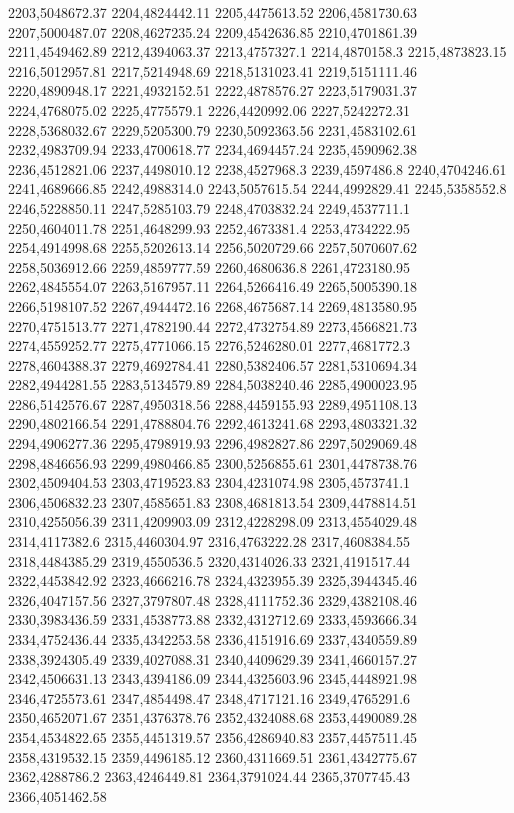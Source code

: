 2203,5048672.37
2204,4824442.11
2205,4475613.52
2206,4581730.63
2207,5000487.07
2208,4627235.24
2209,4542636.85
2210,4701861.39
2211,4549462.89
2212,4394063.37
2213,4757327.1
2214,4870158.3
2215,4873823.15
2216,5012957.81
2217,5214948.69
2218,5131023.41
2219,5151111.46
2220,4890948.17
2221,4932152.51
2222,4878576.27
2223,5179031.37
2224,4768075.02
2225,4775579.1
2226,4420992.06
2227,5242272.31
2228,5368032.67
2229,5205300.79
2230,5092363.56
2231,4583102.61
2232,4983709.94
2233,4700618.77
2234,4694457.24
2235,4590962.38
2236,4512821.06
2237,4498010.12
2238,4527968.3
2239,4597486.8
2240,4704246.61
2241,4689666.85
2242,4988314.0
2243,5057615.54
2244,4992829.41
2245,5358552.8
2246,5228850.11
2247,5285103.79
2248,4703832.24
2249,4537711.1
2250,4604011.78
2251,4648299.93
2252,4673381.4
2253,4734222.95
2254,4914998.68
2255,5202613.14
2256,5020729.66
2257,5070607.62
2258,5036912.66
2259,4859777.59
2260,4680636.8
2261,4723180.95
2262,4845554.07
2263,5167957.11
2264,5266416.49
2265,5005390.18
2266,5198107.52
2267,4944472.16
2268,4675687.14
2269,4813580.95
2270,4751513.77
2271,4782190.44
2272,4732754.89
2273,4566821.73
2274,4559252.77
2275,4771066.15
2276,5246280.01
2277,4681772.3
2278,4604388.37
2279,4692784.41
2280,5382406.57
2281,5310694.34
2282,4944281.55
2283,5134579.89
2284,5038240.46
2285,4900023.95
2286,5142576.67
2287,4950318.56
2288,4459155.93
2289,4951108.13
2290,4802166.54
2291,4788804.76
2292,4613241.68
2293,4803321.32
2294,4906277.36
2295,4798919.93
2296,4982827.86
2297,5029069.48
2298,4846656.93
2299,4980466.85
2300,5256855.61
2301,4478738.76
2302,4509404.53
2303,4719523.83
2304,4231074.98
2305,4573741.1
2306,4506832.23
2307,4585651.83
2308,4681813.54
2309,4478814.51
2310,4255056.39
2311,4209903.09
2312,4228298.09
2313,4554029.48
2314,4117382.6
2315,4460304.97
2316,4763222.28
2317,4608384.55
2318,4484385.29
2319,4550536.5
2320,4314026.33
2321,4191517.44
2322,4453842.92
2323,4666216.78
2324,4323955.39
2325,3944345.46
2326,4047157.56
2327,3797807.48
2328,4111752.36
2329,4382108.46
2330,3983436.59
2331,4538773.88
2332,4312712.69
2333,4593666.34
2334,4752436.44
2335,4342253.58
2336,4151916.69
2337,4340559.89
2338,3924305.49
2339,4027088.31
2340,4409629.39
2341,4660157.27
2342,4506631.13
2343,4394186.09
2344,4325603.96
2345,4448921.98
2346,4725573.61
2347,4854498.47
2348,4717121.16
2349,4765291.6
2350,4652071.67
2351,4376378.76
2352,4324088.68
2353,4490089.28
2354,4534822.65
2355,4451319.57
2356,4286940.83
2357,4457511.45
2358,4319532.15
2359,4496185.12
2360,4311669.51
2361,4342775.67
2362,4288786.2
2363,4246449.81
2364,3791024.44
2365,3707745.43
2366,4051462.58
